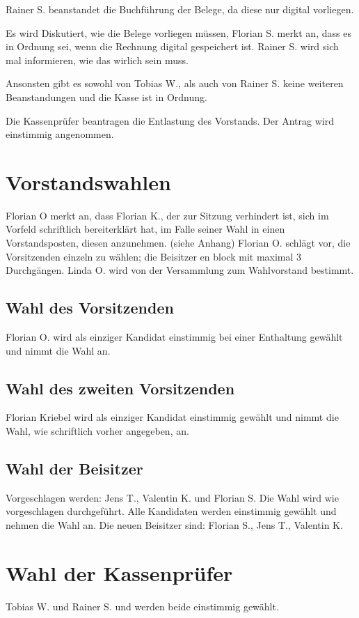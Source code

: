 Rainer S. beanstandet die Buchführung der Belege, da diese nur digital vorliegen.

Es wird Diskutiert, wie die Belege vorliegen müssen, Florian S. merkt an, dass es in Ordnung sei, wenn die Rechnung digital gespeichert ist. Rainer S. wird sich mal informieren, wie das wirlich sein muss.

Ansonsten gibt es sowohl von Tobias W., als auch von Rainer S. keine weiteren Beanstandungen und die Kasse ist in Ordnung.

Die Kassenprüfer beantragen die Entlastung  des Vorstands.
Der Antrag wird einstimmig angenommen.

\section{Vorstandswahlen}
 Florian O merkt an, dass Florian K., der zur Sitzung verhindert ist, sich im Vorfeld schriftlich bereiterklärt hat, im Falle seiner Wahl in einen Vorstandsposten, diesen anzunehmen. (siehe Anhang)
 Florian O. schlägt vor, die Vorsitzenden einzeln zu wählen; die Beisitzer en block mit maximal 3 Durchgängen.
 Linda O. wird von der Versammlung zum Wahlvorstand bestimmt.
\subsection{Wahl des Vorsitzenden}
 Florian O. wird als einziger Kandidat einstimmig bei einer Enthaltung gewählt und nimmt die Wahl an. 
\subsection{Wahl des zweiten Vorsitzenden}         
 Florian Kriebel wird als einziger Kandidat einstimmig gewählt und nimmt die Wahl, wie schriftlich vorher angegeben, an. 
\subsection{Wahl der Beisitzer}
  Vorgeschlagen werden: Jens T., Valentin K. und Florian S.
  Die Wahl wird wie vorgeschlagen durchgeführt. 
  Alle Kandidaten werden einstimmig gewählt und nehmen die Wahl an. 
  Die neuen Beisitzer sind: Florian S., Jens T., Valentin K.

\section{Wahl der Kassenprüfer}
 Tobias W. und Rainer S. und werden beide einstimmig gewählt. 
 
